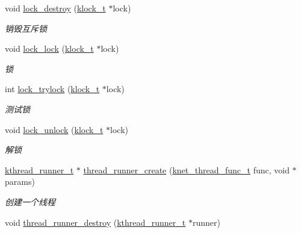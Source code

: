 \begin{DoxyCompactItemize}
void \hyperlink{a00084_aee8678800992b6012933740a9d7528af_aee8678800992b6012933740a9d7528af}{lock\+\_\+destroy} (\hyperlink{a00053_a4c2f62ab63ab1fd49c71e52bbda0f393_a4c2f62ab63ab1fd49c71e52bbda0f393}{klock\+\_\+t} $\ast$lock)
\begin{DoxyCompactList}\small\item\em 销毁互斥锁 \end{DoxyCompactList}\item 
void \hyperlink{a00084_a86243edfa22b75eec0d653c36ba238bf_a86243edfa22b75eec0d653c36ba238bf}{lock\+\_\+lock} (\hyperlink{a00053_a4c2f62ab63ab1fd49c71e52bbda0f393_a4c2f62ab63ab1fd49c71e52bbda0f393}{klock\+\_\+t} $\ast$lock)
\begin{DoxyCompactList}\small\item\em 锁 \end{DoxyCompactList}\item 
int \hyperlink{a00084_a878c20be611d9e051d0e9621546f15a2_a878c20be611d9e051d0e9621546f15a2}{lock\+\_\+trylock} (\hyperlink{a00053_a4c2f62ab63ab1fd49c71e52bbda0f393_a4c2f62ab63ab1fd49c71e52bbda0f393}{klock\+\_\+t} $\ast$lock)
\begin{DoxyCompactList}\small\item\em 测试锁 \end{DoxyCompactList}\item 
void \hyperlink{a00084_ae6d02ffedf7b881d70601d1ee73c3d72_ae6d02ffedf7b881d70601d1ee73c3d72}{lock\+\_\+unlock} (\hyperlink{a00053_a4c2f62ab63ab1fd49c71e52bbda0f393_a4c2f62ab63ab1fd49c71e52bbda0f393}{klock\+\_\+t} $\ast$lock)
\begin{DoxyCompactList}\small\item\em 解锁 \end{DoxyCompactList}\item 
\hyperlink{a00053_a4f78c259c9527c821f1a6f87495dd339_a4f78c259c9527c821f1a6f87495dd339}{kthread\+\_\+runner\+\_\+t} $\ast$ \hyperlink{a00112_gacc8838f250e5f685580a508e93d3f636_gacc8838f250e5f685580a508e93d3f636}{thread\+\_\+runner\+\_\+create} (\hyperlink{a00053_a8741dac4a9f8d97603eb3a30a3473b13_a8741dac4a9f8d97603eb3a30a3473b13}{knet\+\_\+thread\+\_\+func\+\_\+t} func, void $\ast$params)
\begin{DoxyCompactList}\small\item\em 创建一个线程 \end{DoxyCompactList}\item 
void \hyperlink{a00112_gaa9112d70f3e5a8dcf648ce531332f66a_gaa9112d70f3e5a8dcf648ce531332f66a}{thread\+\_\+runner\+\_\+destroy} (\hyperlink{a00053_a4f78c259c9527c821f1a6f87495dd339_a4f78c259c9527c821f1a6f87495dd339}{kthread\+\_\+runner\+\_\+t} $\ast$runner)

\end{DoxyCompactItemize}
